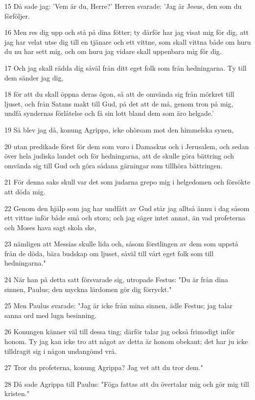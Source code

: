 \par 15 Då sade jag: 'Vem är du, Herre?' Herren svarade: 'Jag är Jesus, den som du förföljer.
\par 16 Men res dig upp och stå på dina fötter; ty därför har jag visat mig för dig, att jag har velat utse dig till en tjänare och ett vittne, som skall vittna både om huru du nu har sett mig, och om huru jag vidare skall uppenbara mig för dig.
\par 17 Och jag skall rädda dig såväl från ditt eget folk som från hedningarna. Ty till dem sänder jag dig,
\par 18 för att du skall öppna deras ögon, så att de omvända sig från mörkret till ljuset, och från Satans makt till Gud, på det att de må, genom tron på mig, undfå syndernas förlåtelse och få sin lott bland dem som äro helgade.'
\par 19 Så blev jag då, konung Agrippa, icke ohörsam mot den himmelska synen,
\par 20 utan predikade först för dem som voro i Damaskus och i Jerusalem, och sedan över hela judiska landet och för hedningarna, att de skulle göra bättring och omvända sig till Gud och göra sådana gärningar som tillhöra bättringen.
\par 21 För denna saks skull var det som judarna grepo mig i helgedomen och försökte att döda mig.
\par 22 Genom den hjälp som jag har undfått av Gud står jag alltså ännu i dag såsom ett vittne inför både små och stora; och jag säger intet annat, än vad profeterna och Moses hava sagt skola ske,
\par 23 nämligen att Messias skulle lida och, såsom förstlingen av dem som uppstå från de döda, bära budskap om ljuset, såväl till vårt eget folk som till hedningarna."
\par 24 När han på detta satt försvarade sig, utropade Festus: "Du är från dina sinnen, Paulus; den myckna lärdomen gör dig förryckt."
\par 25 Men Paulus svarade: "Jag är icke från mina sinnen, ädle Festus; jag talar sanna ord med lugn besinning.
\par 26 Konungen känner väl till dessa ting; därför talar jag också frimodigt inför honom. Ty jag kan icke tro att något av detta är honom obekant; det har ju icke tilldragit sig i någon undangömd vrå.
\par 27 Tror du profeterna, konung Agrippa? Jag vet att du tror dem."
\par 28 Då sade Agrippa till Paulus: "Föga fattas att du övertalar mig och gör mig till kristen."

